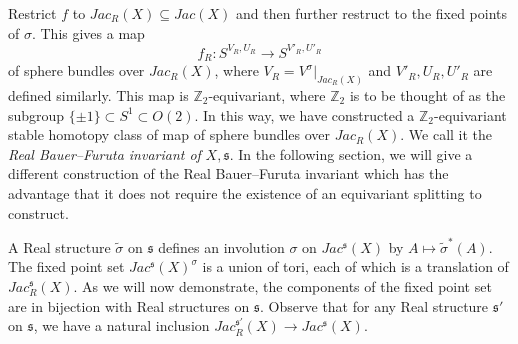 \documentclass{amsart}
\theoremstyle{definition}
\theoremstyle{remark}
\numberwithin{equation}{section}
\begin{document}
Restrict $f$ to $Jac_R(X) \subseteq Jac(X)$ and then further restruct to the fixed points of $\sigma$. This gives a map
\[
f_R : S^{V_R , U_R} \to S^{V'_R , U'_R}
\]
of sphere bundles over $Jac_R(X)$, where $V_R = V^\sigma |_{Jac_R(X)}$ and $V'_R,U_R,U'_R$ are defined similarly. This map is $\mathbb{Z}_2$-equivariant, where $\mathbb{Z}_2$ is to be thought of as the subgroup $\{ \pm 1 \} \subset S^1 \subset O(2)$. In this way, we have constructed a $\mathbb{Z}_2$-equivariant stable homotopy class of map of sphere bundles over $Jac_R(X)$. We call it the {\em Real Bauer--Furuta invariant of} $X,\mathfrak{s}$. In the following section, we will give a different construction of the Real Bauer--Furuta invariant which has the advantage that it does not require the existence of an equivariant splitting to construct.

A Real structure $\widetilde{\sigma}$ on $\mathfrak{s}$ defines an involution $\sigma$ on $Jac^{\mathfrak{s}}(X)$ by $A \mapsto \widetilde{\sigma}^*(A)$. The fixed point set $Jac^{\mathfrak{s}}(X)^{\sigma}$ is a union of tori, each of which is a translation of $Jac_R^{\mathfrak{s}}(X)$. As we will now demonstrate, the components of the fixed point set are in bijection with Real structures on $\mathfrak{s}$. Observe that for any Real structure $\mathfrak{s}'$ on $\mathfrak{s}$, we have a natural inclusion $Jac^{\mathfrak{s}'}_R(X) \to Jac^{\mathfrak{s}}(X)$.
\end{document}
